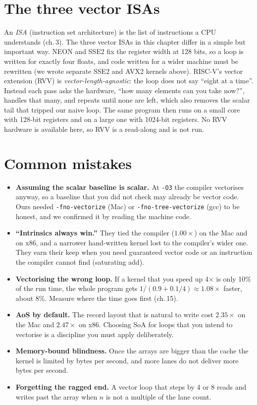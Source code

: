 \section{The three vector ISAs}

An \emph{ISA} (instruction set architecture) is the list of instructions a
CPU understands (ch.\,3). The three vector ISAs in this chapter differ in a
simple but important way. NEON and SSE2 fix the register width at 128 bits,
so a loop is written for exactly four floats, and code written for a wider
machine must be rewritten (we wrote separate SSE2 and AVX2 kernels above).
RISC-V's vector extension (RVV) is \emph{vector-length-agnostic}: the loop does
not say ``eight at a time''. Instead each pass asks the hardware, ``how many
elements can you take now?'', handles that many, and repeats until none are left,
which also removes the scalar tail that tripped our naive loop. The same
program then runs on a small core with 128-bit registers and on a large one with
1024-bit registers. No RVV hardware is available here, so RVV is a read-along
and is not run.


\section{Common mistakes}
\begin{itemize}
\item \textbf{Assuming the scalar baseline is scalar.} At
      \texttt{-O3} the compiler vectorises anyway, so a baseline that
      you did not check may already be vector code. Ours needed
      \texttt{-fno-vectorize} (Mac) or \texttt{-fno-tree-vectorize}
      (gcc) to be honest, and we confirmed it by reading the machine code.
\item \textbf{``Intrinsics always win.''} They tied the
      compiler ($1.00\times$) on the Mac and on x86, and a narrower
      hand-written kernel lost to the compiler's wider one. They earn
      their keep when you need guaranteed vector code or an
      instruction the compiler cannot find (saturating add).
\item \textbf{Vectorising the wrong loop.} If a kernel that you speed
      up 4$\times$ is only 10\% of the run time, the whole program
      gets $1/(0.9+0.1/4)\approx1.08\times$ faster, about 8\%. Measure
      where the time goes first (ch.\,15).
\item \textbf{AoS by default.} The record layout that is natural to
      write cost $2.35\times$ on the Mac and $2.47\times$ on x86. Choosing
      SoA for loops that you intend to vectorise is a discipline you
      must apply deliberately.
\item \textbf{Memory-bound blindness.} Once the arrays are bigger than
      the cache the kernel is limited by bytes per second, and more
      lanes do not deliver more bytes per second.
\item \textbf{Forgetting the ragged end.} A vector loop that steps by 4
      or 8 reads and writes past the array when $n$ is not a multiple of
      the lane count.
\end{itemize}

